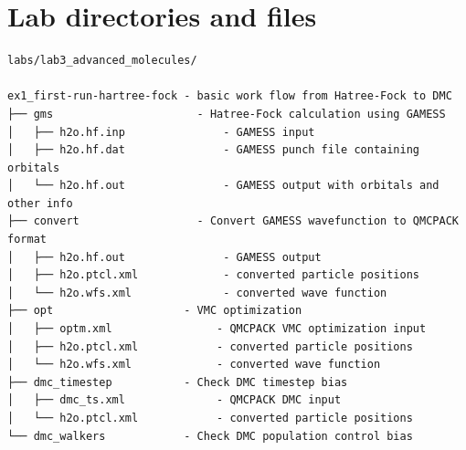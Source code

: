 \section{Lab directories and files}
\begin{shaded}
\begin{verbatim}
labs/lab3_advanced_molecules/

ex1_first-run-hartree-fock - basic work flow from Hatree-Fock to DMC
├── gms                      - Hatree-Fock calculation using GAMESS
│   ├── h2o.hf.inp               - GAMESS input
│   ├── h2o.hf.dat               - GAMESS punch file containing orbitals
│   └── h2o.hf.out               - GAMESS output with orbitals and other info
├── convert                  - Convert GAMESS wavefunction to QMCPACK format
│   ├── h2o.hf.out               - GAMESS output
│   ├── h2o.ptcl.xml             - converted particle positions
│   └── h2o.wfs.xml              - converted wave function
├── opt                    - VMC optimization
│   ├── optm.xml                - QMCPACK VMC optimization input
│   ├── h2o.ptcl.xml            - converted particle positions
│   └── h2o.wfs.xml             - converted wave function 
├── dmc_timestep           - Check DMC timestep bias
│   ├── dmc_ts.xml              - QMCPACK DMC input
│   └── h2o.ptcl.xml            - converted particle positions
└── dmc_walkers            - Check DMC population control bias


\end{verbatim}
\end{shaded}
